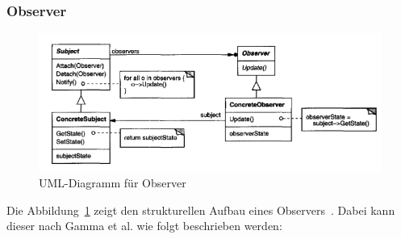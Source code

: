 \subsubsection{Observer}

\begin{figure}[h]
    \centering
    \includegraphics[scale=0.75]{figures/observer.png}
    \caption{UML-Diagramm für Observer}
    \label{fig:observer}
\end{figure}

Die Abbildung~\ref{fig:observer} zeigt den strukturellen Aufbau eines Observers~\cite[S. 293]{gamma1994design}.
Dabei kann dieser nach Gamma et al. wie folgt beschrieben werden:


